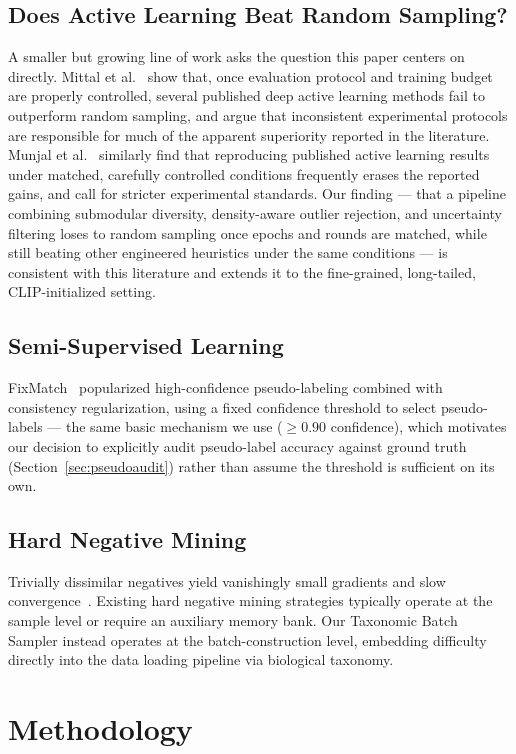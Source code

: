 \documentclass[conference]{IEEEtran}
\begin{document}
\subsection{Does Active Learning Beat Random Sampling?}
A smaller but growing line of work asks the question this paper centers on directly. Mittal et al.~\cite{mittal2019parting} show that, once evaluation protocol and training budget are properly controlled, several published deep active learning methods fail to outperform random sampling, and argue that inconsistent experimental protocols are responsible for much of the apparent superiority reported in the literature. Munjal et al.~\cite{munjal2022towards} similarly find that reproducing published active learning results under matched, carefully controlled conditions frequently erases the reported gains, and call for stricter experimental standards. Our finding — that a pipeline combining submodular diversity, density-aware outlier rejection, and uncertainty filtering loses to random sampling once epochs and rounds are matched, while still beating other engineered heuristics under the same conditions — is consistent with this literature and extends it to the fine-grained, long-tailed, CLIP-initialized setting.

\subsection{Semi-Supervised Learning}
FixMatch~\cite{sohn2020fixmatch} popularized high-confidence pseudo-labeling combined with consistency regularization, using a fixed confidence threshold to select pseudo-labels — the same basic mechanism we use ($\geq 0.90$ confidence), which motivates our decision to explicitly audit pseudo-label accuracy against ground truth (Section~\ref{sec:pseudoaudit}) rather than assume the threshold is sufficient on its own.

\subsection{Hard Negative Mining}
Trivially dissimilar negatives yield vanishingly small gradients and slow convergence~\cite{khosla2020supcon}. Existing hard negative mining strategies typically operate at the sample level or require an auxiliary memory bank. Our Taxonomic Batch Sampler instead operates at the batch-construction level, embedding difficulty directly into the data loading pipeline via biological taxonomy.

\section{Methodology}
\end{document}
